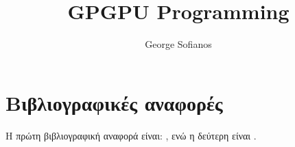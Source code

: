 \documentclass[11pt,a4paper,twoside]{book}
\author{George Sofianos}
\title{GPGPU Programming}
\begin{document}

 
\tableofcontents






\section{Βιβλιογραφικές αναφορές}
H πρώτη βιβλιογραφική αναφορά είναι: \parencite{doe}, ενώ η δεύτερη είναι \parencite{papadopoulos}.

\printbibliography[title={Βιβλιογραφία}]
\end{document}

